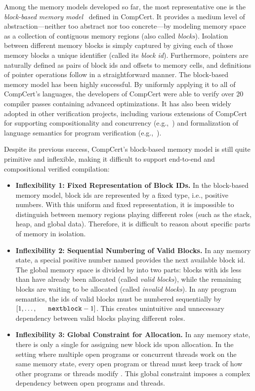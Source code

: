 Among the memory models developed so far, the most representative one
is the \emph{block-based memory model}~\cite{leroy08,compcert-mem-v2}
defined in CompCert.  It provides a medium level of
abstraction---neither too abstract nor too concrete---by modeling
memory space as a collection of contiguous memory regions (also called
\emph{blocks}). Isolation between different memory blocks is simply
captured by giving each of those memory blocks a unique identifier
(called its \emph{block id}). Furthermore, pointers are naturally
defined as pairs of block ids and offsets to memory cells, and
definitions of pointer operations follow in a straightforward manner.
The block-based memory model has been highly successful. By uniformly
applying it to all of CompCert's languages, the developers of CompCert
were able to verify over 20 compiler passes containing advanced
optimizations.  It has also been widely adopted in other verification
projects, including various extensions of CompCert for supporting
compositionality and concurrency
(e.g.,~\cite{sevcik13,stewart15,compcertm,cascompcert,wang2019,wang2020,hur16,compcerts})
and formalization of language semantics for program verification
(e.g.,~\cite{appel11:vst,dscal15,ccal18}).

Despite its previous success, CompCert's block-based memory model is
still quite primitive and inflexible, making it difficult to support
end-to-end and compositional verified compilation: 

\begin{itemize}
\item 
\textbf{Inflexibility 1: Fixed Representation of Block IDs.}
%
In the block-based memory model, block ids are represented by a fixed
type, i.e., positive numbers. With this uniform and fixed
representation, it is impossible to distinguish between memory regions
playing different roles (such as the stack, heap, and global
data). Therefore, it is difficult to reason about specific parts of
memory in isolation.

\item
\textbf{Inflexibility 2: Sequential Numbering of Valid Blocks.}  
%
In any memory state, a special positive number named \nextblock
provides the next available block id. The global memory space is
divided by \nextblock into two parts: blocks with ids less than
\nextblock have already been allocated (called \emph{valid blocks}),
while the remaining blocks are waiting to be allocated (called
\emph{invalid blocks}). In any program semantics, the ids of valid
blocks must be numbered sequentially by $[1,\ldots,\nextblock-1]$.
This creates unintuitive and unnecessary dependency between valid
blocks playing different roles.

\item
\textbf{Inflexibility 3: Global Constraint for Allocation.}
%
In any memory state, there is only a single \nextblock for assigning
new block ids upon allocation. In the setting where multiple open
programs or concurrent threads work on the same memory state, every
open program or thread must keep track of how other programs or
threads modify \nextblock. This global constraint imposes a complex
dependency between open programs and threads.
\end{itemize}

